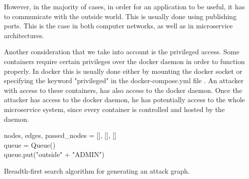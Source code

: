 However, in the majority of cases, in order for an application to be useful, it has to communicate with the outside world. This is usually done using publishing ports. This is the case in both computer networks, as well as in microservice architectures.

Another consideration that we take into account is the privileged access. Some containers require certain privileges over the docker daemon in order to function properly. In docker this is usually done either by mounting the docker socket or specifying the keyword "privileged" in the docker-compose.yml file . An attacker with access to these containers, has also access to the docker daemon. Once the attacker has access to the docker daemon, he has potentially access to the whole microservice system, since every container is controlled and hosted by the daemon.





\begin{algorithm}
	\SetAlgoLined
	nodes, edges, passed\_nodes = [], [], [] \\
	queue = Queue() \\
	queue.put("outside" + "ADMIN") \\
	
		
		\caption{Breadth-first search algorithm for generating an attack graph.}
		\label{BFSalgorithm}
	\end{algorithm}
	

